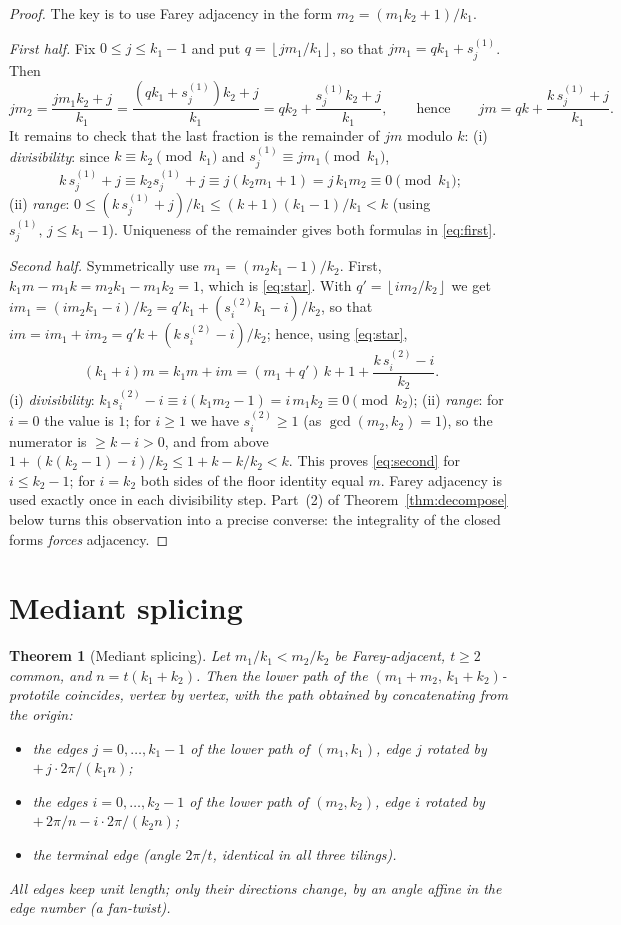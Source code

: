 \documentclass[11pt]{article}
\newtheorem{theorem}{Theorem}[section]
\theoremstyle{remark}
\theoremstyle{definition}
\newcommand{\floor}[1]{\left\lfloor #1 \right\rfloor}
\begin{document}
\begin{proof}
The key is to use Farey adjacency in the form $m_2=(m_1k_2+1)/k_1$.

\emph{First half.} Fix $0\le j\le k_1-1$ and put $q=\floor{jm_1/k_1}$, so that
$jm_1=qk_1+s^{(1)}_j$. Then
\[
jm_2=\frac{jm_1k_2+j}{k_1}=\frac{(qk_1+s^{(1)}_j)k_2+j}{k_1}
= qk_2+\frac{s^{(1)}_jk_2+j}{k_1},
\qquad\text{hence}\qquad
jm = qk + \frac{k\,s^{(1)}_j+j}{k_1}.
\]
It remains to check that the last fraction is the remainder of $jm$ modulo $k$:
(i) \emph{divisibility}: since $k\equiv k_2\pmod{k_1}$ and
$s^{(1)}_j\equiv jm_1 \pmod{k_1}$,
\[
k\,s^{(1)}_j + j \equiv k_2 s^{(1)}_j + j \equiv j(k_2m_1+1) = j\,k_1m_2 \equiv 0 \pmod{k_1};
\]
(ii) \emph{range}: $0\le (k\,s^{(1)}_j+j)/k_1 \le (k+1)(k_1-1)/k_1 < k$
(using $s^{(1)}_j,\,j\le k_1-1$).
Uniqueness of the remainder gives both formulas in \eqref{eq:first}.

\emph{Second half.} Symmetrically use $m_1=(m_2k_1-1)/k_2$. First,
$k_1m-m_1k = m_2k_1-m_1k_2 = 1$, which is \eqref{eq:star}. With
$q'=\floor{im_2/k_2}$ we get
$im_1=(im_2k_1-i)/k_2=q'k_1+(s^{(2)}_ik_1-i)/k_2$, so that
$im = im_1+im_2 = q'k + (k\,s^{(2)}_i-i)/k_2$; hence, using \eqref{eq:star},
\[
(k_1+i)m = k_1m + im = (m_1+q')\,k + 1 + \frac{k\,s^{(2)}_i-i}{k_2}.
\]
(i) \emph{divisibility}: $k_1s^{(2)}_i - i\equiv i(k_1m_2-1)= i\,m_1k_2\equiv 0\pmod{k_2}$;
(ii) \emph{range}: for $i=0$ the value is $1$; for $i\ge 1$ we have $s^{(2)}_i\ge1$
(as $\gcd(m_2,k_2)=1$), so the numerator is $\ge k-i>0$, and from above
$1+(k(k_2-1)-i)/k_2 \le 1+k-k/k_2 < k$. This proves \eqref{eq:second} for
$i\le k_2-1$; for $i=k_2$ both sides of the floor identity equal $m$.
Farey adjacency is used exactly once in each divisibility step.
Part~(2) of Theorem~\ref{thm:decompose} below turns this observation into a precise
converse: the integrality of the closed forms \emph{forces} adjacency.
\end{proof}

\section{Mediant splicing}\label{sec:splice}

\begin{theorem}[Mediant splicing]\label{thm:splice}
Let $m_1/k_1<m_2/k_2$ be Farey-adjacent, $t\ge2$ common, and $n=t(k_1+k_2)$.
Then the lower path of the $(m_1+m_2,\,k_1+k_2)$-prototile coincides, vertex by vertex,
with the path obtained by concatenating from the origin:
\begin{itemize}
\item the edges $j=0,\dots,k_1-1$ of the lower path of $(m_1,k_1)$, edge $j$ rotated by
$+\,j\cdot 2\pi/(k_1 n)$;
\item the edges $i=0,\dots,k_2-1$ of the lower path of $(m_2,k_2)$, edge $i$ rotated by
$+\,2\pi/n - i\cdot 2\pi/(k_2 n)$;
\item the terminal edge (angle $2\pi/t$, identical in all three tilings).
\end{itemize}
All edges keep unit length; only their directions change, by an angle affine in the
edge number (a \emph{fan-twist}).
\end{theorem}
\end{document}
